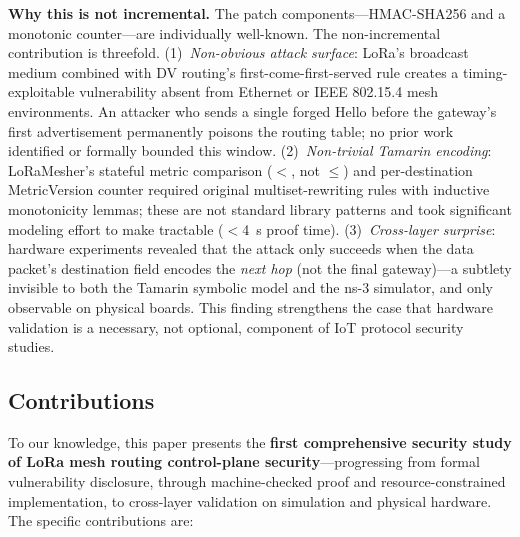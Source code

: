 \documentclass[10pt,journal,compsoc]{IEEEtran}
\begin{document}
\textbf{Why this is not incremental.}
The patch components—HMAC-SHA256 and a monotonic counter—are
individually well-known. The non-incremental contribution is
threefold.
(1)~\emph{Non-obvious attack surface}: LoRa's broadcast medium
combined with DV routing's first-come-first-served rule creates a
timing-exploitable vulnerability absent from Ethernet or IEEE
802.15.4 mesh environments. An attacker who sends a single forged
Hello before the gateway's first advertisement permanently poisons
the routing table; no prior work identified or formally bounded
this window.
(2)~\emph{Non-trivial Tamarin encoding}: LoRaMesher's stateful metric
comparison ($<$, not $\leq$) and per-destination MetricVersion
counter required original multiset-rewriting rules with inductive
monotonicity lemmas; these are not standard library patterns and
took significant modeling effort to make tractable ($<$4~s proof time).
(3)~\emph{Cross-layer surprise}: hardware experiments revealed that
the attack only succeeds when the data packet's destination field
encodes the \emph{next hop} (not the final gateway)—a subtlety
invisible to both the Tamarin symbolic model and the ns-3 simulator,
and only observable on physical boards. This finding strengthens the
case that hardware validation is a necessary, not optional, component
of IoT protocol security studies.

\subsection{Contributions}

To our knowledge, this paper presents the \textbf{first
comprehensive security study of LoRa mesh routing control-plane
security}—progressing from formal vulnerability disclosure, through
machine-checked proof and resource-constrained implementation, to
cross-layer validation on simulation and physical hardware.
The specific contributions are:
\end{document}
